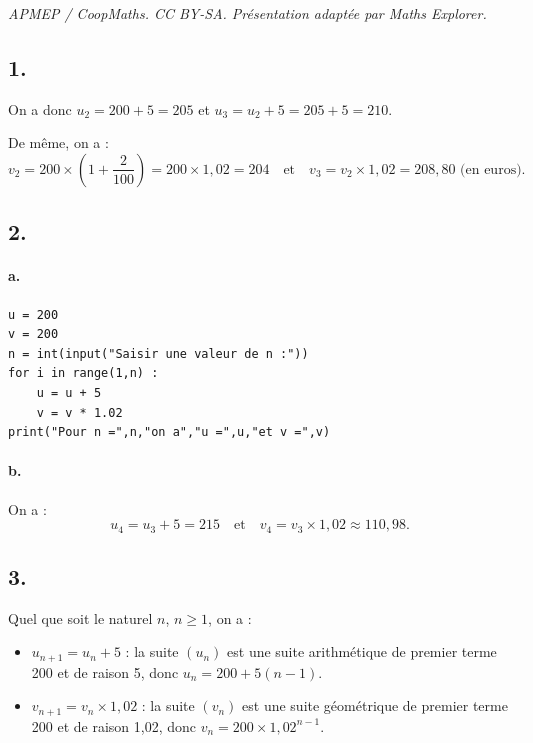 \documentclass[10pt]{article}
\begin{document}
\noindent\textit{APMEP / CoopMaths. CC BY-SA. Présentation adaptée par Maths Explorer.}\par\medskip
\subsection*{1.}

On a donc \( u_2 = 200 + 5 = 205 \) et \( u_3 = u_2 + 5 = 205 + 5 = 210 \).

De même, on a :
\[
v_2 = 200 \times \left(1 + \dfrac{2}{100}\right) = 200 \times 1{,}02 = 204 \quad \text{et} \quad v_3 = v_2 \times 1{,}02 = 208{,}80 \text{ (en euros)}.
\]

\subsection*{2.}

\paragraph{a.}
\begin{center}
\begin{lstlisting}[style=python]
u = 200
v = 200
n = int(input("Saisir une valeur de n :"))
for i in range(1,n) :
    u = u + 5 
    v = v * 1.02
print("Pour n =",n,"on a","u =",u,"et v =",v)
\end{lstlisting}
\end{center}

\paragraph{b.} On a :
\[
u_4 = u_3 + 5 = 215 \quad \text{et} \quad v_4 = v_3 \times 1{,}02 \approx 110{,}98.
\]

\subsection*{3.}

Quel que soit le naturel \( n \), \( n \geq 1 \), on a :
\begin{itemize}
    \item \( u_{n+1} = u_n + 5 \) : la suite \( (u_n) \) est une suite arithmétique de premier terme 200 et de raison 5, donc \( u_n = 200 + 5(n - 1) \).
    \item \( v_{n+1} = v_n \times 1{,}02 \) : la suite \( (v_n) \) est une suite géométrique de premier terme 200 et de raison 1{,}02, donc \( v_n = 200 \times 1{,}02^{n-1} \).
\end{itemize}
\end{document}

